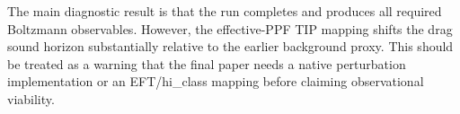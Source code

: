 The main diagnostic result is that the run completes and produces all required Boltzmann observables. However, the effective-PPF TIP mapping shifts the drag sound horizon substantially relative to the earlier background proxy. This should be treated as a warning that the final paper needs a native perturbation implementation or an EFT/hi\_class mapping before claiming observational viability.
